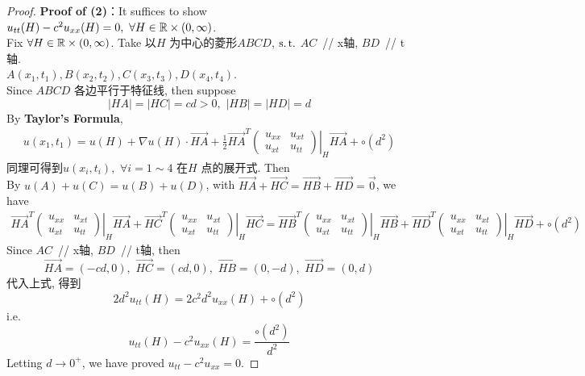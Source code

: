 \begin{thm}
		\begin{proof}
			\textbf{Proof of (2)}：It suffices to show $u_{tt}(H) - c^2 u_{xx}(H) = 0 , \,\, \forall H \in \mathbb{R} \times (0 , \infty)$. \\
			Fix $\forall H \in \mathbb{R} \times (0 , \infty)$. Take 以$H$ 为中心的菱形$ABCD$, $\operatorname{s.t.}$ $AC \,$ // x轴, $BD \,$ // t轴.  \\
			$A(x_1 , t_1) , B(x_2 , t_2) , C(x_3 , t_3) , D(x_4 , t_4)$. \\
			Since $ABCD$ 各边平行于特征线, then suppose 
			\[ \left| HA \right| = \left| HC \right| = cd > 0 , \,\, \left| HB \right| = \left| HD \right| = d \]
			By \textbf{Taylor's Formula}, 
			\begin{align*}
				u(x_1 , t_1) 
				= u(H) + \nabla u(H) \cdot \overrightarrow{HA} + \frac{1}{2} \overrightarrow{HA}^T 
				\left. 
				\begin{pmatrix*}
					u_{xx} &u_{xt} \\
					u_{xt} &u_{tt}
				\end{pmatrix*} 
				\right|_{H} \overrightarrow{HA} + \circ(d^2) 
			\end{align*}
			同理可得到$u(x_i , t_i) , \,\, \forall i = 1 \sim 4$ 在$H$ 点的展开式. Then \\
			By $u(A) + u(C) = u(B) + u(D)$, with $\overrightarrow{HA} + \overrightarrow{HC} = \overrightarrow{HB} + \overrightarrow{HD} = \vec{0}$, we have
			\begin{align*}
				\overrightarrow{HA}^T 
				\left. 
				\begin{pmatrix*}
					u_{xx} &u_{xt} \\
					u_{xt} &u_{tt}
				\end{pmatrix*} 
				\right|_{H} \overrightarrow{HA} + 
				\overrightarrow{HC}^T 
				\left. 
				\begin{pmatrix*}
					u_{xx} &u_{xt} \\
					u_{xt} &u_{tt}
				\end{pmatrix*} 
				\right|_{H} \overrightarrow{HC} 
				= 
				\overrightarrow{HB}^T 
				\left. 
				\begin{pmatrix*}
					u_{xx} &u_{xt} \\
					u_{xt} &u_{tt}
				\end{pmatrix*} 
				\right|_{H} \overrightarrow{HB} + 
				\overrightarrow{HD}^T 
				\left. 
				\begin{pmatrix*}
					u_{xx} &u_{xt} \\
					u_{xt} &u_{tt}
				\end{pmatrix*} 
				\right|_{H} \overrightarrow{HD} + \circ(d^2)
			\end{align*}
			Since $AC \,$ // x轴, $BD \,$ // t轴, then
			\[ \overrightarrow{HA} = (-cd , 0) , \,\, \overrightarrow{HC} = (cd , 0) , \,\, \overrightarrow{HB} = (0 , -d) , \,\, \overrightarrow{HD} = (0 , d) \]
			代入上式, 得到
			\[ 2d^2 u_{tt}(H) = 2c^2 d^2 u_{xx}(H) + \circ(d^2) \]
			i.e. 
			\[ u_{tt}(H) - c^2 u_{xx}(H) = \frac{\circ(d^2)}{d^2} \]
			Letting $d \to 0^+$, we have proved $u_{tt} - c^2 u_{xx} = 0$. 
		\end{proof}
	\end{thm}
	
	


	\ifx\allfiles\undefined

\fi